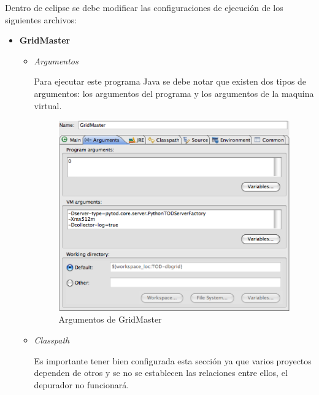\documentclass[12pt,legalpaper]{report}
\begin{document}
Dentro de eclipse se debe modificar las configuraciones de ejecución de los siguientes archivos:

\begin{itemize}
	\item \textbf{GridMaster}
	\begin{itemize}
		\item \textit{Argumentos}

Para ejecutar este programa Java se debe notar que existen dos tipos de argumentos: los argumentos del programa y los argumentos de la maquina virtual.

\begin{figure}[h]
	\centering
	\includegraphics[scale=0.5]{images/aspectoFuncionamiento/argsGridMaster.eps}
	\caption{Argumentos de GridMaster}
\end{figure}		
		
		\item \textit{Classpath}
		
Es importante tener bien configurada esta sección ya que varios proyectos dependen de otros y se no se establecen las relaciones entre ellos, el depurador no funcionará.
		

\end{itemize}
\end{itemize}
\end{document}
